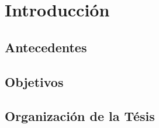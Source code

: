 \chapter{Introducción}
\label{Ch:1}
\graphicspath{{figs/}}

\section{Antecedentes}
\label{S:ch1-antecedentes}

\section{Objetivos}
\label{S:ch1-objetivos}

\section{Organización de la Tésis}
\label{S:ch1-organización}


